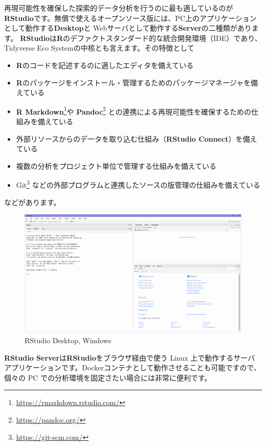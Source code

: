 \documentclass[
  12pt,
]{book}
\DeclareRobustCommand{\href}[2]{#2\footnote{\url{#1}}}
\providecommand{\tightlist}{%
  \setlength{\itemsep}{0pt}\setlength{\parskip}{0pt}}
\begin{document}
再現可能性を確保した探索的データ分析を行うのに最も適しているのが\textbf{RStudio}です。無償で使えるオープンソース版には、PC上のアプリケーションとして動作する\textbf{Desktop}と Webサーバとして動作する\textbf{Server}の二種類があります。 \textbf{RStudio}は\textbf{R}のデファクトスタンダード的な統合開発環境（IDE）であり、Tidyverse Eco Systemの中核とも言えます。その特徴として

\begin{itemize}
\tightlist
\item
  \textbf{R}のコードを記述するのに適したエディタを備えている
\item
  \textbf{R}のパッケージをインストール・管理するためのパッケージマネージャを備えている
\item
  \href{https://rmarkdown.rstudio.com/}{\textbf{R Markdown}}や \href{https://pandoc.org/}{\textbf{Pandoc}} との連携による再現可能性を確保するための仕組みを備えている
\item
  外部リソースからのデータを取り込む仕組み（\textbf{RStudio Connect}）を備えている
\item
  複数の分析をプロジェクト単位で管理する仕組みを備えている
\item
  \href{https://git-scm.com/}{Git} などの外部プログラムと連携したソースの版管理の仕組みを備えている
\end{itemize}

などがあります。

\begin{figure}[H]

{\centering \includegraphics[width=0.85\linewidth,]{./fig/RStudio/DT} 

}

\caption{RStudio Desktop, Windows}\label{fig:unnamed-chunk-17}
\end{figure}

\textbf{RStudio Server}は\textbf{RStudio}をブラウザ経由で使う Linux 上で動作するサーバアプリケーションです。Dockerコンテナとして動作させることも可能ですので、個々の PC での分析環境を固定さたい場合には非常に便利です。
\end{document}
